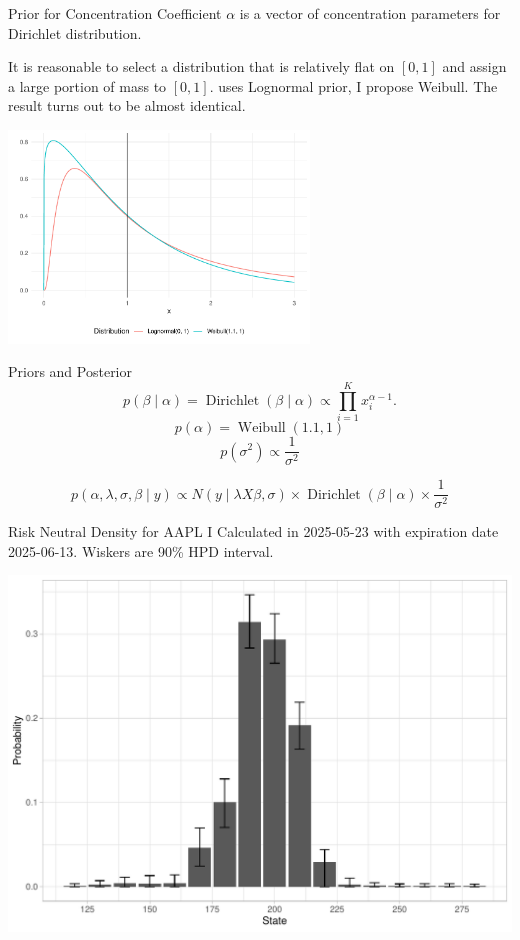 \documentclass[10pt,aspectratio=43]{beamer}
\begin{document}
\begin{frame}{Prior for Concentration Coefficient}
    $\alpha$ is a vector of concentration parameters for Dirichlet distribution. 
    
    It is reasonable to select a distribution that is relatively flat on $[0,1]$ and assign a large portion of mass to $[0,1]$. \cite{fisherSimplexRegression2016} uses Lognormal prior, I propose Weibull. The result turns out to be almost identical.

    \includegraphics[width=0.6\textwidth]{prior_difference.pdf}

\end{frame}

\begin{frame}{Priors and Posterior}
     \[p(\beta\mid \alpha)=\operatorname{Dirichlet}(\beta\mid \alpha)\propto \prod_{i=1}^{K}x_{i}^{\alpha-1}.\]
    \[p(\alpha)=\operatorname{Weibull}(1.1,1)\]
    \[p(\sigma^2)\propto \frac{1}{\sigma^2}\]

    \[p(\alpha,\lambda,\sigma,\beta\mid y)\propto N(y\mid \lambda X\beta,\sigma)\times\operatorname{Dirichlet}(\beta\mid \alpha)\times \frac{1}{\sigma^2}\]

\end{frame}





\begin{frame}{Risk Neutral Density for AAPL I}
    Calculated in 2025-05-23 with expiration date 2025-06-13. Wiskers are 90\% HPD interval.
    \begin{center}
        \includegraphics[width=0.8\linewidth]{betas_23_1.pdf}
    \end{center}
    
\end{frame}
\end{document}
